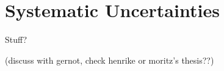 \section{Systematic Uncertainties}  

Stuff?

{\color{red}(discuss with gernot, check henrike or moritz's thesis??)}


